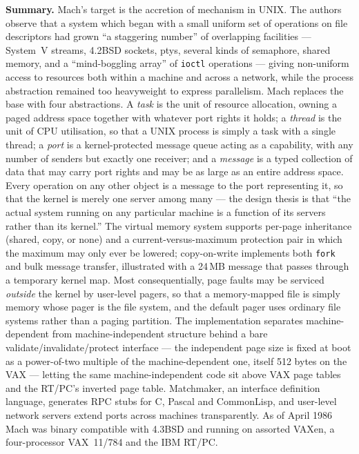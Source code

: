 \textbf{Summary.} Mach's target is the accretion of mechanism in UNIX. The authors observe
that a system which began with a small uniform set of operations on file descriptors had
grown ``a staggering number'' of overlapping facilities --- System~V streams, 4.2BSD
sockets, ptys, several kinds of semaphore, shared memory, and a ``mind-boggling array'' of
\texttt{ioctl} operations --- giving non-uniform access to resources both within a machine
and across a network, while the process abstraction remained too heavyweight to express
parallelism. Mach replaces the base with four abstractions. A \emph{task} is the unit of
resource allocation, owning a paged address space together with whatever port rights it
holds; a \emph{thread} is the unit of CPU utilisation, so that a UNIX process is simply a
task with a single thread; a
\emph{port} is a kernel-protected message queue acting as a capability, with any number of
senders but exactly one receiver; and a \emph{message} is a typed collection of data that may
carry port rights and may be as large as an entire address space. Every operation on any
other object is a message to the port representing it, so that the kernel is merely one
server among many --- the design thesis is that ``the actual system running on any particular
machine is a function of its servers rather than its kernel.'' The virtual memory system
supports per-page inheritance (shared, copy, or none) and a current-versus-maximum protection
pair in which the maximum may only ever be lowered; copy-on-write implements both
\texttt{fork} and bulk message transfer, illustrated with a 24\,MB message that passes
through a temporary kernel map. Most consequentially, page faults may be serviced
\emph{outside} the kernel by user-level pagers, so that a memory-mapped file is simply memory
whose pager is the file system, and the default pager uses ordinary file systems rather than
a paging partition. The implementation separates machine-dependent from machine-independent
structure behind a bare validate/invalidate/protect interface --- the independent page size
is fixed at boot as a power-of-two multiple of the machine-dependent one, itself 512 bytes on
the VAX --- letting the same
machine-independent code sit above VAX page tables and the RT/PC's inverted page table.
Matchmaker, an interface definition language, generates RPC stubs for C, Pascal and
CommonLisp, and user-level network servers extend ports across machines transparently.
As of April 1986 Mach was binary compatible with 4.3BSD and running on assorted VAXen, a
four-processor VAX~11/784 and the IBM RT/PC.

